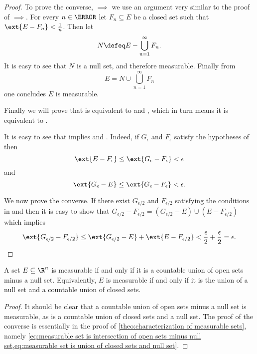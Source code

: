\documentclass[12pt,oneside]{book}
\begin{document}
{\begin{proof}
	To prove the converse, \( \implies \) we use an argument very
	similar to the proof of \( \implies \). For every \(
	n \in \N \) let \( F_n \subseteq E \) be a closed set such that \( \ext{E - F_n} <
	\frac{1}{n} \). Then let
	\begin{equation*}
		N \defeq E - \bigcup_{n = 1}^{\infty} F_n.
	\end{equation*}
	It is easy to see that \( N \) is a null set, and therefore measurable. Finally from
	\begin{equation}\label{eq:measurable set is union of closed sets and null set}
		E = N \cup \bigcup_{n = 1}^\infty F_n
	\end{equation}
	one concludes \( E \) is measurable.

	\parbreak

	Finally we will prove that  is equivalent to  and
	, which in turn means it is equivalent to .

	It is easy to see that  implies  and . Indeed, if
	\( G_\epsilon \) and \( F_\epsilon \) satisfy the hypotheses of  then
	\begin{equation*}
		\ext{E - F_\epsilon} \leq \ext{G_\epsilon - F_\epsilon} < \epsilon
	\end{equation*}
	and 
	\begin{equation*}
		\ext{G_\epsilon - E} \leq \ext{G_\epsilon - F_\epsilon} < \epsilon.
	\end{equation*}

	We now prove the converse. If there exist \( G_{\epsilon/2} \) and \(
	F_{\epsilon/2} \) satisfying the conditions in  and  then it is
	easy to show that \( G_{\epsilon/2} - F_{\epsilon/2} = (G_{\epsilon/2} - E) \cup (E -
	F_{\epsilon/2}) \)
	which implies
	\begin{equation*}
		\ext{G_{\epsilon/2} - F_{\epsilon/2}} \leq \ext{G_{\epsilon/2} - E} + \ext{E -
		F_{\epsilon/2}} < \frac{\epsilon}{2} + \frac{\epsilon}{2} = \epsilon.
	\end{equation*}
\end{proof}
}

\begin{corollary}
	A set \( E \subseteq \R^n \) is measurable if and only if it is a countable union of open
	sets minus a null set. Equivalently, \( E \) is measurable if and only if it is the
	union of a null set and a countable union of closed sets.
\end{corollary}
\begin{proof}
	It should be clear that a countable union of open sets minus a null set is measurable,
	as is a countable union of closed sets and a null set. The proof of the converse is
	essentially in the proof of \cref{theo:characterization of measurable sets}, namely
	\cref{eq:measurable set is intersection of open sets minus null set,eq:measurable set is
	union of closed sets and null set}.
\end{proof}
\end{document}
